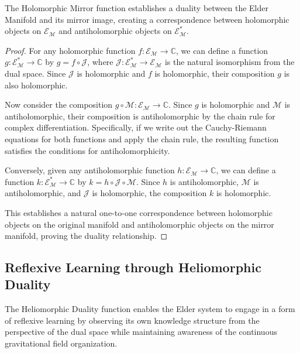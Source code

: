 \begin{theorem}
The Holomorphic Mirror function establishes a duality between the Elder Manifold and its mirror image, creating a correspondence between holomorphic objects on $\mathcal{E}_{\mathcal{M}}$ and antiholomorphic objects on $\mathcal{E}_{\mathcal{M}}^*$.
\end{theorem}

\begin{proof}
For any holomorphic function $f: \mathcal{E}_{\mathcal{M}} \rightarrow \mathbb{C}$, we can define a function $g: \mathcal{E}_{\mathcal{M}}^* \rightarrow \mathbb{C}$ by $g = f \circ \mathcal{J}$, where $\mathcal{J}: \mathcal{E}_{\mathcal{M}}^* \rightarrow \mathcal{E}_{\mathcal{M}}$ is the natural isomorphism from the dual space. Since $\mathcal{J}$ is holomorphic and $f$ is holomorphic, their composition $g$ is also holomorphic.

Now consider the composition $g \circ \mathcal{M}: \mathcal{E}_{\mathcal{M}} \rightarrow \mathbb{C}$. Since $g$ is holomorphic and $\mathcal{M}$ is antiholomorphic, their composition is antiholomorphic by the chain rule for complex differentiation. Specifically, if we write out the Cauchy-Riemann equations for both functions and apply the chain rule, the resulting function satisfies the conditions for antiholomorphicity.

Conversely, given any antiholomorphic function $h: \mathcal{E}_{\mathcal{M}} \rightarrow \mathbb{C}$, we can define a function $k: \mathcal{E}_{\mathcal{M}}^* \rightarrow \mathbb{C}$ by $k = h \circ \mathcal{J} \circ \mathcal{M}$. Since $h$ is antiholomorphic, $\mathcal{M}$ is antiholomorphic, and $\mathcal{J}$ is holomorphic, the composition $k$ is holomorphic.

This establishes a natural one-to-one correspondence between holomorphic objects on the original manifold and antiholomorphic objects on the mirror manifold, proving the duality relationship.
\end{proof}

\subsection{Reflexive Learning through Heliomorphic Duality}

The Heliomorphic Duality function enables the Elder system to engage in a form of reflexive learning by observing its own knowledge structure from the perspective of the dual space while maintaining awareness of the continuous gravitational field organization.

